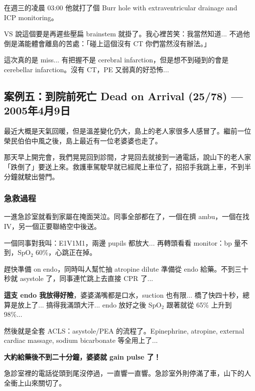 \documentclass[12pt,a4paper]{article}
\newenvironment{myquote}{%
    \begin{tcolorbox}[
        colback=quote_bg,
        colframe=emergency_gray,
        boxrule=0pt,
        leftrule=3pt,
        arc=0pt,
        left=10pt,
        right=10pt,
        top=8pt,
        bottom=8pt
    ]
    \itshape
}{%
    \end{tcolorbox}
}
\begin{document}
在週三的凌晨 03:00 他就打了個 Burr hole with extraventricular drainage and ICP monitoring。

VS 說這個要是再遲些壓扁 brainstem 就掛了。我心裡苦笑：我當然知道... 不過他倒是滿能體會離島的苦處：「碰上這個沒有 CT 你們當然沒有辦法。」

\begin{myquote}
這次真的是 miss... 有把握不是 cerebral infarction，但是想不到碰到的會是 cerebellar infarction。沒有 CT，PE 又弱真的好恐怖...
\end{myquote}

\subsection{案例五：到院前死亡 Dead on Arrival (25/78) — 2005年4月9日}

最近大概是天氣回暖，但是溫差變化仍大，島上的老人家很多人感冒了。繼前一位榮民伯伯中風之後，島上最近有一位老婆婆也走了。

那天早上開完會，我們晃晃回到診間，才晃回去就接到一通電話，說山下的老人家「跌倒了」要送上來。救護車駕駛早就已經爬上車位了，招招手我跳上車，不到半分鐘就駛出營門。

\subsubsection{急救過程}

一進急診室就看到家屬在掩面哭泣。同事全部都在了，一個在擠 ambu，一個在找 IV，另一個正要聯絡空中後送。

一個同事對我叫：E1V1M1，兩邊 pupils 都放大... 再轉頭看看 monitor：bp 量不到，SpO$_2$ 60\%，心跳正在掉。

趕快準備 on endo，同時叫人幫忙抽 atropine dilute 準備從 endo 給藥。不到三十秒就 asystole 了，同事連忙跳上去直接 CPR 了...

\textbf{這支 endo 我放得好險}，婆婆滿嘴都是口水，suction 也有限... 橋了快四十秒，總算是放上了... 搞得我滿頭大汗... endo 放好之後 SpO$_2$ 跟著就從 65\% 上升到 98\%...

然後就是全套 ACLS：asystole/PEA 的流程了。Epinephrine, atropine, external cardiac massage, sodium bicarbonate 等全用上了...

\begin{center}
\textbf{\Large\color{emergency_blue} 大約給藥後不到二十分鐘，婆婆就 gain pulse 了！}
\end{center}

急診室裡的電話從頭到尾沒停過，一直響一直響。急診室外則停滿了車，山下的人全衝上山來關切了。
\end{document}
